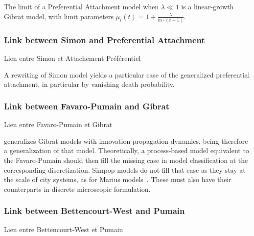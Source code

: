 \begin{lemma}
The limit of a Preferential Attachment model when $\lambda \ll 1$ is a linear-growth Gibrat model, with limit parameters $\mu_i(t)=1+\frac{\lambda}{m\cdot (t-1)}$.
\end{lemma}





\subsubsection{Link between Simon and Preferential Attachment}{Lien entre Simon et Attachement Préférentiel}

A rewriting of Simon model yields a particular case of the generalized preferential attachment, in particular by vanishing death probability.

\subsubsection{Link between Favaro-Pumain and Gibrat}{Lien entre Favaro-Pumain et Gibrat}

\cite{favaro2011gibrat} generalizes Gibrat models with innovation propagation dynamics, being therefore a generalization of that model. Theoretically, a process-based model equivalent to the Favaro-Pumain should then fill the missing case in model classification at the corresponding discretization. Simpop models do not fill that case as they stay at the scale of city systems, as for Marius models~\cite{cottineau2014evolution}. These must also have their counterparts in discrete microscopic formulation.


\subsubsection{Link between Bettencourt-West and Pumain}{Lien entre Bettencourt-West et Pumain}


